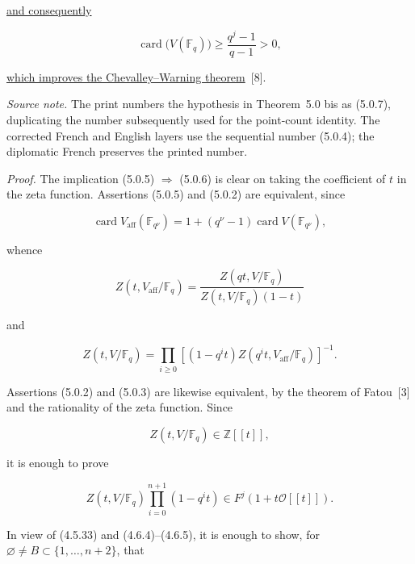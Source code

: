 \underline{and consequently}

\begin{equation}\tag{5.0.6 bis}
\operatorname{card}\bigl(V(\mathbb F_q)\bigr)
\geq\frac{q^j-1}{q-1}>0,
\end{equation}

\noindent
\underline{which improves the Chevalley--Warning theorem}~[8].

\medskip
\noindent\emph{Source note.}
The print numbers the hypothesis in Theorem~5.0 bis as (5.0.7), duplicating
the number subsequently used for the point-count identity.  The corrected
French and English layers use the sequential number (5.0.4); the diplomatic
French preserves the printed number.

\medskip
\noindent\emph{Proof.}
The implication (5.0.5) $\Rightarrow$ (5.0.6) is clear on taking the
coefficient of $t$ in the zeta function.  Assertions (5.0.5) and (5.0.2)
are equivalent, since

\begin{equation}\tag{5.0.7}
\operatorname{card}V_{\mathrm{aff}}(\mathbb F_{q^\nu})
=1+(q^\nu-1)\operatorname{card}V(\mathbb F_{q^\nu}),
\end{equation}

whence

\begin{equation}\tag{5.0.8}
Z(t,V_{\mathrm{aff}}/\mathbb F_q)
=\frac{Z(qt,V/\mathbb F_q)}
{Z(t,V/\mathbb F_q)(1-t)}
\end{equation}

and

\begin{equation}\tag{5.0.9}
Z(t,V/\mathbb F_q)
=\prod_{i\geq0}
\left[(1-q^it)Z(q^it,V_{\mathrm{aff}}/\mathbb F_q)\right]^{-1}.
\end{equation}

\noindent
Assertions (5.0.2) and (5.0.3) are likewise equivalent, by the theorem of
Fatou~[3] and the rationality of the zeta function.  Since

\begin{equation}\tag{5.0.10}
Z(t,V/\mathbb F_q)\in\mathbb Z[[t]],
\end{equation}

it is enough to prove

\begin{equation}\tag{5.0.11}
Z(t,V/\mathbb F_q)\prod_{i=0}^{n+1}(1-q^it)
\in F^j(1+t\mathcal O[[t]]).
\end{equation}

In view of (4.5.33) and (4.6.4)--(4.6.5), it is enough to show, for
$\varnothing\ne B\subset\{1,\ldots,n+2\}$, that

